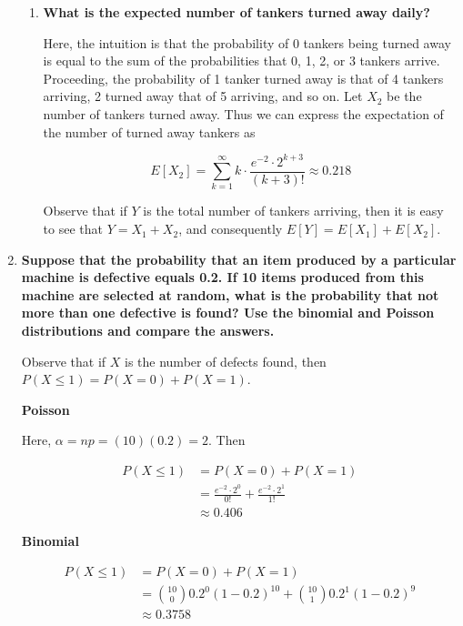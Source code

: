 \documentclass[10pt, oneside]{article}   	%
\theoremstyle{definition}
\begin{document}
\begin{enumerate}[label=8.\arabic*]
\begin{enumerate}
	\item  \begin{tcolorbox}[
	  colback=Cerulean!5!white,
	  colframe=Cerulean!75!black]
	\textbf{What is the expected number of tankers turned away daily?}
	\end{tcolorbox}
	
	Here, the intuition is that the probability of 0 tankers being turned away is equal to the sum of the probabilities that 0, 1, 2, or 3 tankers arrive. Proceeding, the probability of 1 tanker turned away is that of 4 tankers arriving, 2 turned away that of 5 arriving, and so on. Let $X_2$ be the number of tankers turned away. Thus we can express the expectation of the number of turned away tankers as
	
	\[ E[X_2] = \sum^{\infty}_{k = 1} k \cdot \frac{e^{-2} \cdot 2^{k+3}}{(k+3)!} \approx \boxed{0.218} \]
	
	Observe that if $Y$ is the total number of tankers arriving, then it is easy to see that $Y = X_1 + X_2$, and consequently $E[Y] = E[X_1] + E[X_2]$.
	\end{enumerate}

\item  \begin{tcolorbox}[
  colback=Cerulean!5!white,
  colframe=Cerulean!75!black]
\textbf{Suppose that the probability that an item produced by a particular machine is defective equals 0.2. If 10 items produced from this machine are selected at random, what is the probability that not more than one defective is found? Use the binomial and Poisson distributions and compare the answers.}
\end{tcolorbox}

Observe that if $X$ is the number of defects found, then $P(X \leq 1) = P(X = 0) + P(X = 1)$.

\textbf{Poisson}

Here, $\alpha = np = (10)(0.2) = 2$. Then

\begin{align*}
P(X \leq 1) &= P(X = 0) + P(X = 1) \\
&= \frac{e^{-2} \cdot 2^0}{0!} + \frac{e^{-2} \cdot 2^1}{1!} \\
&\approx \boxed{0.406}
\end{align*}

\textbf{Binomial}

\begin{align*}
P(X \leq 1) &= P(X = 0) + P(X = 1) \\
&= \binom{10}{0} 0.2^0 (1-0.2)^{10} + \binom{10}{1} 0.2^1 (1 -0.2)^9 \\
&\approx \boxed{0.3758}
\end{align*}


\end{enumerate}
\end{document}
